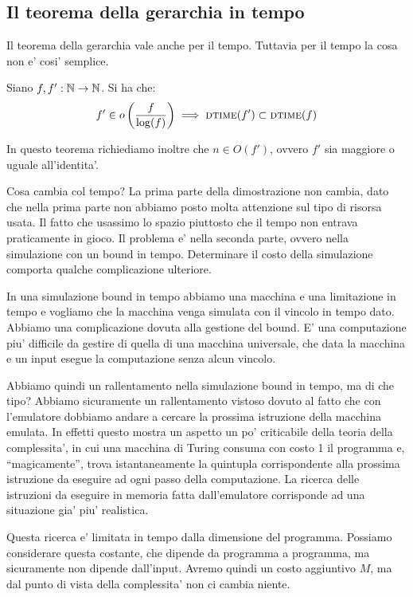 \subsection{Il teorema della gerarchia in tempo}

Il teorema della gerarchia vale anche per il tempo. Tuttavia per il tempo la cosa non e' cosi'
semplice.

\begin{thm}
    Siano $f,f':\mathbb{N} \to \mathbb{N}$. Si ha che:
    \begin{equation*}
        f' \in o\left(\frac{f}{\log(f)}\right) \implies \textsc{dtime}(f') \subset \textsc{dtime}(f)
    \end{equation*}
\end{thm}

In questo teorema richiediamo inoltre che $n \in O(f')$, ovvero $f'$ sia maggiore o uguale
all'identita'.

Cosa cambia col tempo? La prima parte della dimostrazione non cambia, dato che nella prima parte non
abbiamo posto molta attenzione sul tipo di risorsa usata. Il fatto che usassimo lo spazio piuttosto
che il tempo non entrava praticamente in gioco. Il problema e' nella seconda parte, ovvero
nella simulazione con un bound in tempo. Determinare il costo della simulazione comporta qualche
complicazione ulteriore.

In una simulazione bound in tempo abbiamo una macchina e una limitazione in tempo e vogliamo che la
macchina venga simulata con il vincolo in tempo dato. Abbiamo una complicazione dovuta alla gestione
del bound. E' una computazione piu' difficile da gestire di quella di una macchina universale, che
data la macchina e un input esegue la computazione senza alcun vincolo.

Abbiamo quindi un rallentamento nella simulazione bound in tempo, ma di che tipo? Abbiamo
sicuramente un rallentamento vistoso dovuto al fatto che con l'emulatore dobbiamo andare a cercare
la prossima istruzione della macchina emulata. In effetti questo mostra un aspetto un po'
criticabile della teoria della complessita', in cui una macchina di Turing consuma con costo 1 il
programma e, ``magicamente'', trova istantaneamente la quintupla corrispondente alla prossima
istruzione da eseguire ad ogni passo della computazione. La ricerca delle istruzioni da eseguire in
memoria fatta dall'emulatore corrisponde ad una situazione gia' piu' realistica.

Questa ricerca e' limitata in tempo dalla dimensione del programma. Possiamo considerare questa
costante, che dipende da programma a programma, ma sicuramente non dipende dall'input. Avremo quindi
un costo aggiuntivo $M$, ma dal punto di vista della complessita' non ci cambia niente.

